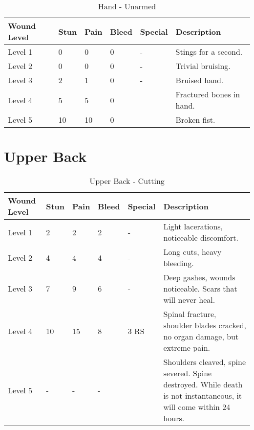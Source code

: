 \documentclass[oneside,11pt,english]{book}
\begin{document}
\begin{table}[!hb] %
	\caption{Hand - Unarmed}
	\label{wound:Hand - Unarmed}
	\begin{tabu} to 
Wound Level &Stun &Pain &Bleed &Special &Description\\\toprule
Level 1& 0& 0& 0& - &Stings for a second.\\
Level 2& 0& 0& 0& - &Trivial bruising.\\
Level 3& 2& 1& 0& - &Bruised hand.\\
Level 4& 5& 5& 0&  &Fractured bones in hand.\\
Level 5& 10& 10& 0&  &Broken fist.\\
	\end{tabu}
\end{table}
\clearpage

\section{Upper Back} \vspace{-25pt} \label{sec:upper-back}
\begin{table}[!hb] %
	\caption{Upper Back - Cutting}
	\label{wound:Upper Back - Cutting}
	\begin{tabu} to 
		Wound Level &Stun &Pain &Bleed &Special &Description\\\toprule
		Level 1& 2& 2& 2& - &Light lacerations, noticeable discomfort.\\
		Level 2& 4& 4& 4& - &Long cuts, heavy bleeding.\\
		Level 3& 7& 9& 6& - &Deep gashes, wounds noticeable. Scars that will never heal.\\
		Level 4& 10& 15& 8&  3 RS &Spinal fracture, shoulder blades cracked, no organ damage, but extreme pain.\\
		Level 5& - &- &- && Shoulders cleaved, spine severed. Spine destroyed. While death is not instantaneous, it will come within 24 hours.\\
	\end{tabu}
\end{table}
\end{document}
